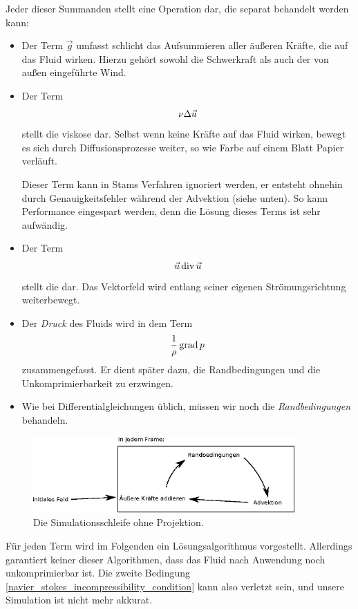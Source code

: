Jeder dieser Summanden stellt eine Operation dar, die
separat behandelt werden kann:

\begin{itemize}
\item
	Der Term $\vec{g}$ umfasst schlicht das Aufsummieren aller äußeren
	Kräfte, die auf das Fluid wirken. Hierzu gehört sowohl die Schwerkraft
	als auch der von außen eingeführte Wind.
\item
	Der Term
	\begin{equation}
	\nu \Delta \vec{u}
	\end{equation}
	stellt die viskose  dar. Selbst wenn keine
	Kräfte auf das Fluid wirken, bewegt es sich durch Diffusionsprozesse
	weiter, so wie Farbe auf einem Blatt Papier verläuft.

	Dieser Term kann in Stams Verfahren ignoriert werden, er entsteht
	ohnehin durch Genauigkeitsfehler während der Advektion (siehe unten). So
	kann Performance eingespart werden, denn die Lösung dieses Terms ist
	sehr aufwändig.
\item
	Der Term
	\begin{equation}
	\vec{u} \operatorname*{div} \vec{u}
	\end{equation}
	stellt die  dar. Das Vektorfeld wird entlang
	seiner eigenen Strömungsrichtung weiterbewegt.
\item
	Der \emph{Druck} des Fluids wird in dem Term
	\begin{equation}
	\frac{1}{\rho} \operatorname*{grad} p
	\end{equation}
	zusammengefasst. Er dient später dazu, die Randbedingungen und die
	Unkomprimierbarkeit zu erzwingen.
\item
	Wie bei Differentialgleichungen üblich, müssen wir noch die
	\emph{Randbedingungen} behandeln.
\end{itemize}

\begin{figure}[ht]
\includegraphics[width=10cm]{images/stam_loop}
\caption{Die Simulationsschleife ohne Projektion.}
\end{figure}

Für jeden Term wird im Folgenden ein Lösungsalgorithmus vorgestellt. Allerdings
garantiert keiner dieser Algorithmen, dass das Fluid nach Anwendung noch
unkomprimierbar ist. Die zweite Bedingung
\ref{navier_stokes_incompressibility_condition} kann also verletzt sein, und
unsere Simulation ist nicht mehr akkurat.

